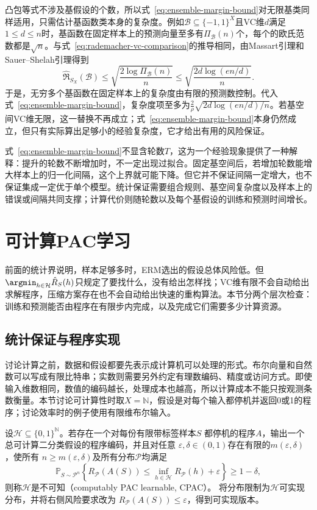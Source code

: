 凸包等式不涉及基假设的个数，所以式~\eqref{eq:ensemble-margin-bound}对无限基类同样适用，只需估计基函数类本身的复杂度。例如$\mathcal B\subseteq\{-1,1\}^X$且VC维$d$满足$1\leq d\leq n$时，基函数在固定样本上的预测向量至多有$\Pi_{\mathcal B}(n)$个，每个的欧氏范数都是$\sqrt n$。与式~\eqref{eq:rademacher-vc-comparison}的推导相同，由Massart引理和Sauer--Shelah引理得到
\[
 \widehat{\mathfrak R}_{S_X}(\mathcal B)
 \leq\sqrt{\frac{2\log\Pi_{\mathcal B}(n)}{n}}
 \leq\sqrt{\frac{2d\log(en/d)}{n}}.
\]
于是，无穷多个基函数在固定样本上的复杂度由有限的预测数控制。代入式~\eqref{eq:ensemble-margin-bound}，复杂度项至多为$\frac{2}{\rho}\sqrt{2d\log(en/d)/n}$。若基空间VC维无限，这一替换不再成立；式~\eqref{eq:ensemble-margin-bound}本身仍然成立，但只有实际算出足够小的经验复杂度，它才给出有用的风险保证。

式~\eqref{eq:ensemble-margin-bound}不显含轮数$T$，这为一个经验现象提供了一种解释：提升的轮数不断增加时，不一定出现过拟合。固定基空间后，若增加轮数能增大样本上的归一化间隔，这个上界就可能下降。但它并不保证间隔一定增大，也不保证集成一定优于单个模型。统计保证需要组合规则、基空间复杂度以及样本上的错误或间隔共同支撑；计算代价则随轮数以及每个基假设的训练和预测时间增长。

\section{可计算PAC学习}
\label{sec:computable-binary-learning}

前面的统计界说明，样本足够多时，ERM选出的假设总体风险低。但$\argmin_{h\in\mathcal H}\hat R_S(h)$只规定了要找什么，没有给出怎样找；VC维有限不会自动给出求解程序，压缩方案存在也不会自动给出快速的重构算法。本节分两个层次检查：训练和预测能否由程序在有限步内完成，以及完成它们需要多少计算资源。

\subsection{统计保证与程序实现}

讨论计算之前，数据和假设都要先表示成计算机可以处理的形式。布尔向量和自然数可以写成有限比特串；实数则需要另外约定有理数编码、精度或访问方式。即使输入维数相同，数值的编码越长，处理成本也越高，所以计算成本不能只按观测条数衡量。本节讨论可计算性时取$X=\mathbb N$，假设是对每个输入都停机并返回0或1的程序；讨论效率时的例子使用有限维布尔输入。

\begin{definition}[可计算PAC学习]
\label{def:binary-computable-pac}
设$\mathcal H\subseteq\{0,1\}^{\mathbb N}$。若存在一个对每份有限带标签样本$S$
都停机的程序$A$，输出一个总可计算二分类假设的程序编码，并且对任意
$\varepsilon,\delta\in(0,1)$存在有限的$m(\varepsilon,\delta)$，使所有
$n\geq m(\varepsilon,\delta)$及所有分布$\mathcal P$均满足
\[
 \mathbb P_{S\sim\mathcal P^n}\left\{
 R_{\mathcal P}(A(S))\leq\inf_{h\in\mathcal H}R_{\mathcal P}(h)+\varepsilon
 \right\}\geq1-\delta,
\]
则称$\mathcal H$是不可知（computably PAC learnable, CPAC）。
将分布限制为$\mathcal H$可实现分布，并将右侧风险要求改为
$R_{\mathcal P}(A(S))\leq\varepsilon$，得到可实现版本。
\end{definition}

